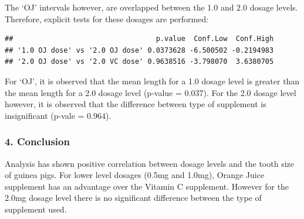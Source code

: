 \documentclass[]{article}
\newenvironment{Shaded}{\begin{snugshade}}{\end{snugshade}}
\newcommand{\KeywordTok}[1]{\textcolor[rgb]{0.13,0.29,0.53}{\textbf{{#1}}}}
\newcommand{\DataTypeTok}[1]{\textcolor[rgb]{0.13,0.29,0.53}{{#1}}}
\newcommand{\DecValTok}[1]{\textcolor[rgb]{0.00,0.00,0.81}{{#1}}}
\newcommand{\FloatTok}[1]{\textcolor[rgb]{0.00,0.00,0.81}{{#1}}}
\newcommand{\StringTok}[1]{\textcolor[rgb]{0.31,0.60,0.02}{{#1}}}
\newcommand{\OtherTok}[1]{\textcolor[rgb]{0.56,0.35,0.01}{{#1}}}
\newcommand{\NormalTok}[1]{{#1}}
\begin{document}
The `OJ' intervals however, are overlapped between the 1.0 and 2.0
dosage levels. Therefore, explicit tests for these dosages are
performed:

\begin{Shaded}
\end{Shaded}

\begin{verbatim}
##                                  p.value  Conf.Low  Conf.High
## '1.0 OJ dose' vs '2.0 OJ dose' 0.0373628 -6.500502 -0.2194983
## '2.0 OJ dose' vs '2.0 VC dose' 0.9638516 -3.798070  3.6380705
\end{verbatim}

For `OJ', it is observed that the mean length for a 1.0 dosage level is
greater than the mean length for a 2.0 dosage level (p-value = 0.037).
For the 2.0 dosage level however, it is observed that the difference
between type of supplement is insignificant (p-vale = 0.964).

\subsubsection{4. Conclusion}\label{conclusion}

Analysis has shown positive correlation between dosage levels and the
tooth size of guinea pigs. For lower level dosages (0.5mg and 1.0mg),
Orange Juice supplement has an advantage over the Vitamin C supplement.
However for the 2.0mg dosage level there is no significant difference
between the type of supplement used.
\end{document}
